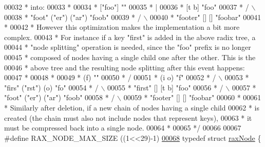 \begin{DoxyCode}
00032 \textcolor{comment}{ * into:}
00033 \textcolor{comment}{ *}
00034 \textcolor{comment}{ *                  ["foo"] ""}
00035 \textcolor{comment}{ *                     |}
00036 \textcolor{comment}{ *                  [t   b] "foo"}
00037 \textcolor{comment}{ *                  /     \(\backslash\)}
00038 \textcolor{comment}{ *        "foot" ("er")    ("ar") "foob"}
00039 \textcolor{comment}{ *                 /          \(\backslash\)}
00040 \textcolor{comment}{ *       "footer" []          [] "foobar"}
00041 \textcolor{comment}{ *}
00042 \textcolor{comment}{ * However this optimization makes the implementation a bit more complex.}
00043 \textcolor{comment}{ * For instance if a key "first" is added in the above radix tree, a}
00044 \textcolor{comment}{ * "node splitting" operation is needed, since the "foo" prefix is no longer}
00045 \textcolor{comment}{ * composed of nodes having a single child one after the other. This is the}
00046 \textcolor{comment}{ * above tree and the resulting node splitting after this event happens:}
00047 \textcolor{comment}{ *}
00048 \textcolor{comment}{ *}
00049 \textcolor{comment}{ *                    (f) ""}
00050 \textcolor{comment}{ *                    /}
00051 \textcolor{comment}{ *                 (i o) "f"}
00052 \textcolor{comment}{ *                 /   \(\backslash\)}
00053 \textcolor{comment}{ *    "firs"  ("rst")  (o) "fo"}
00054 \textcolor{comment}{ *              /        \(\backslash\)}
00055 \textcolor{comment}{ *    "first" []       [t   b] "foo"}
00056 \textcolor{comment}{ *                     /     \(\backslash\)}
00057 \textcolor{comment}{ *           "foot" ("er")    ("ar") "foob"}
00058 \textcolor{comment}{ *                    /          \(\backslash\)}
00059 \textcolor{comment}{ *          "footer" []          [] "foobar"}
00060 \textcolor{comment}{ *}
00061 \textcolor{comment}{ * Similarly after deletion, if a new chain of nodes having a single child}
00062 \textcolor{comment}{ * is created (the chain must also not include nodes that represent keys),}
00063 \textcolor{comment}{ * it must be compressed back into a single node.}
00064 \textcolor{comment}{ *}
00065 \textcolor{comment}{ */}
00066 
00067 \textcolor{preprocessor}{#}\textcolor{preprocessor}{define} \textcolor{preprocessor}{RAX\_NODE\_MAX\_SIZE} \textcolor{preprocessor}{(}\textcolor{preprocessor}{(}1\textcolor{preprocessor}{<<}29\textcolor{preprocessor}{)}\textcolor{preprocessor}{-}1\textcolor{preprocessor}{)}
\hyperlink{structraxNode}{00068} \textcolor{keyword}{typedef} \textcolor{keyword}{struct} \hyperlink{structraxNode}{raxNode} \{

\end{DoxyCode}
